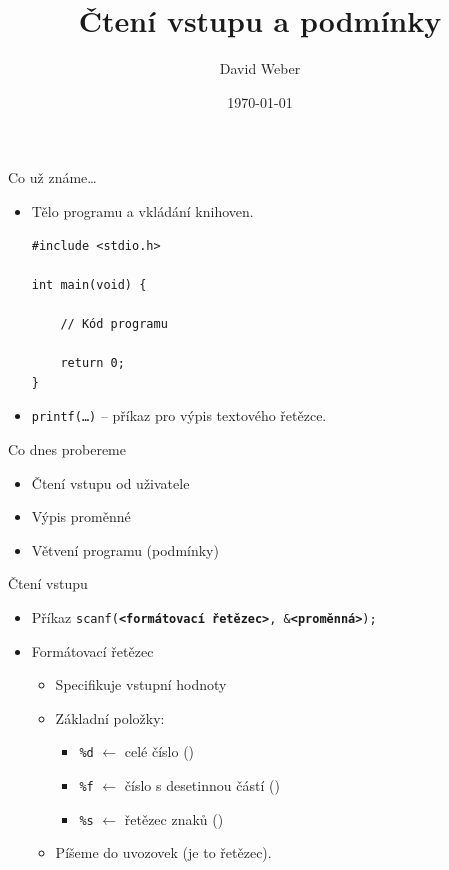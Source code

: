 \documentclass[14pt]{beamer}
\title{Čtení vstupu a podmínky}
\author{David Weber}
\date{\today}
\begin{document}

    \begin{frame}
        \titlepage
    \end{frame}

    \begin{frame}[t,fragile]{Co už známe\dots}
        \begin{itemize}
            \item Tělo programu a vkládání knihoven.
            \begin{lstlisting}
#include <stdio.h>

int main(void) {

    // Kód programu

    return 0;
}
            \end{lstlisting}
            \item \texttt{printf(\dots)} -- příkaz pro výpis textového řetězce.
        \end{itemize}
    \end{frame}

    \begin{frame}[t]{Co dnes probereme}
        \begin{itemize}
            \item Čtení vstupu od uživatele
            \item Výpis proměnné
            \item Větvení programu (podmínky)
        \end{itemize}
    \end{frame}

    \begin{frame}[t]{Čtení vstupu}
        \begin{itemize}
            \item Příkaz \texttt{scanf(\textbf{<formátovací řetězec>}, \&\textbf{<proměnná>});}
            \item Formátovací řetězec
            \begin{itemize}
                \item Specifikuje  vstupní hodnoty
                \item Základní položky:
                \begin{itemize}
                    \item \texttt{\%d} $\leftarrow$ celé číslo ()
                    \item \texttt{\%f} $\leftarrow$ číslo s desetinnou částí ()
                    \item \texttt{\%s} $\leftarrow$ řetězec znaků ()
                \end{itemize}
                \item Píšeme do uvozovek \textquotedbl{} \textquotedbl (je to řetězec).
            \end{itemize}
        \end{itemize}
    \end{frame}
\end{document}
